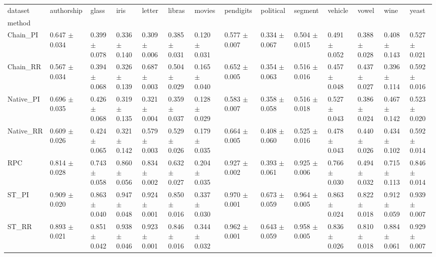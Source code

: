 \begin{tabular}{llllllllllllll}
\toprule
dataset &           authorship &                glass &                 iris &               letter &               libras &               movies &            pendigits &            political &              segment &              vehicle &                vowel &                 wine &                yeast \\
method    &                      &                      &                      &                      &                      &                      &                      &                      &                      &                      &                      &                      &                      \\
\midrule
Chain_PI  &  0.647 $ \pm $ 0.034 &  0.399 $ \pm $ 0.078 &  0.336 $ \pm $ 0.140 &  0.309 $ \pm $ 0.006 &  0.385 $ \pm $ 0.031 &  0.120 $ \pm $ 0.031 &  0.577 $ \pm $ 0.007 &  0.334 $ \pm $ 0.067 &  0.504 $ \pm $ 0.015 &  0.491 $ \pm $ 0.052 &  0.388 $ \pm $ 0.028 &  0.408 $ \pm $ 0.143 &  0.527 $ \pm $ 0.021 \\
Chain_RR  &  0.567 $ \pm $ 0.034 &  0.394 $ \pm $ 0.068 &  0.326 $ \pm $ 0.139 &  0.687 $ \pm $ 0.003 &  0.504 $ \pm $ 0.029 &  0.165 $ \pm $ 0.040 &  0.652 $ \pm $ 0.005 &  0.354 $ \pm $ 0.063 &  0.516 $ \pm $ 0.016 &  0.457 $ \pm $ 0.048 &  0.437 $ \pm $ 0.027 &  0.396 $ \pm $ 0.114 &  0.592 $ \pm $ 0.016 \\
Native_PI &  0.696 $ \pm $ 0.035 &  0.426 $ \pm $ 0.068 &  0.319 $ \pm $ 0.135 &  0.321 $ \pm $ 0.004 &  0.359 $ \pm $ 0.037 &  0.128 $ \pm $ 0.029 &  0.583 $ \pm $ 0.007 &  0.358 $ \pm $ 0.058 &  0.516 $ \pm $ 0.018 &  0.527 $ \pm $ 0.043 &  0.386 $ \pm $ 0.024 &  0.467 $ \pm $ 0.142 &  0.523 $ \pm $ 0.020 \\
Native_RR &  0.609 $ \pm $ 0.026 &  0.424 $ \pm $ 0.065 &  0.321 $ \pm $ 0.142 &  0.579 $ \pm $ 0.003 &  0.529 $ \pm $ 0.026 &  0.179 $ \pm $ 0.035 &  0.664 $ \pm $ 0.005 &  0.408 $ \pm $ 0.060 &  0.525 $ \pm $ 0.016 &  0.478 $ \pm $ 0.043 &  0.440 $ \pm $ 0.026 &  0.434 $ \pm $ 0.102 &  0.592 $ \pm $ 0.014 \\
RPC       &  0.814 $ \pm $ 0.028 &  0.743 $ \pm $ 0.058 &  0.860 $ \pm $ 0.056 &  0.834 $ \pm $ 0.002 &  0.632 $ \pm $ 0.027 &  0.204 $ \pm $ 0.035 &  0.927 $ \pm $ 0.002 &  0.393 $ \pm $ 0.061 &  0.925 $ \pm $ 0.006 &  0.766 $ \pm $ 0.030 &  0.494 $ \pm $ 0.032 &  0.715 $ \pm $ 0.113 &  0.846 $ \pm $ 0.014 \\
ST_PI     &  0.909 $ \pm $ 0.020 &  0.863 $ \pm $ 0.040 &  0.947 $ \pm $ 0.048 &  0.924 $ \pm $ 0.001 &  0.850 $ \pm $ 0.016 &  0.337 $ \pm $ 0.030 &  0.970 $ \pm $ 0.001 &  0.673 $ \pm $ 0.059 &  0.964 $ \pm $ 0.005 &  0.863 $ \pm $ 0.024 &  0.822 $ \pm $ 0.018 &  0.912 $ \pm $ 0.059 &  0.939 $ \pm $ 0.007 \\
ST_RR     &  0.893 $ \pm $ 0.021 &  0.851 $ \pm $ 0.042 &  0.938 $ \pm $ 0.046 &  0.923 $ \pm $ 0.001 &  0.846 $ \pm $ 0.016 &  0.344 $ \pm $ 0.032 &  0.962 $ \pm $ 0.001 &  0.643 $ \pm $ 0.059 &  0.958 $ \pm $ 0.005 &  0.836 $ \pm $ 0.026 &  0.810 $ \pm $ 0.018 &  0.884 $ \pm $ 0.061 &  0.929 $ \pm $ 0.007 \\
\bottomrule
\end{tabular}
